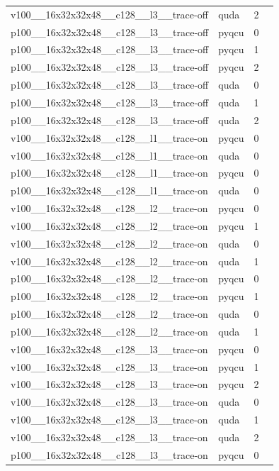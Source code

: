\begin{table}[htbp]
\begin{tabular}{@{}llrr@{}}
v100\_\_16x32x32x48\_\_c128\_\_l3\_\_trace-off & quda & 2 &  \\
p100\_\_16x32x32x48\_\_c128\_\_l3\_\_trace-off & pyqcu & 0 &  \\
p100\_\_16x32x32x48\_\_c128\_\_l3\_\_trace-off & pyqcu & 1 &  \\
p100\_\_16x32x32x48\_\_c128\_\_l3\_\_trace-off & pyqcu & 2 &  \\
p100\_\_16x32x32x48\_\_c128\_\_l3\_\_trace-off & quda & 0 &  \\
p100\_\_16x32x32x48\_\_c128\_\_l3\_\_trace-off & quda & 1 &  \\
p100\_\_16x32x32x48\_\_c128\_\_l3\_\_trace-off & quda & 2 &  \\
v100\_\_16x32x32x48\_\_c128\_\_l1\_\_trace-on & pyqcu & 0 &  \\
v100\_\_16x32x32x48\_\_c128\_\_l1\_\_trace-on & quda & 0 &  \\
p100\_\_16x32x32x48\_\_c128\_\_l1\_\_trace-on & pyqcu & 0 &  \\
p100\_\_16x32x32x48\_\_c128\_\_l1\_\_trace-on & quda & 0 &  \\
v100\_\_16x32x32x48\_\_c128\_\_l2\_\_trace-on & pyqcu & 0 &  \\
v100\_\_16x32x32x48\_\_c128\_\_l2\_\_trace-on & pyqcu & 1 &  \\
v100\_\_16x32x32x48\_\_c128\_\_l2\_\_trace-on & quda & 0 &  \\
v100\_\_16x32x32x48\_\_c128\_\_l2\_\_trace-on & quda & 1 &  \\
p100\_\_16x32x32x48\_\_c128\_\_l2\_\_trace-on & pyqcu & 0 &  \\
p100\_\_16x32x32x48\_\_c128\_\_l2\_\_trace-on & pyqcu & 1 &  \\
p100\_\_16x32x32x48\_\_c128\_\_l2\_\_trace-on & quda & 0 &  \\
p100\_\_16x32x32x48\_\_c128\_\_l2\_\_trace-on & quda & 1 &  \\
v100\_\_16x32x32x48\_\_c128\_\_l3\_\_trace-on & pyqcu & 0 &  \\
v100\_\_16x32x32x48\_\_c128\_\_l3\_\_trace-on & pyqcu & 1 &  \\
v100\_\_16x32x32x48\_\_c128\_\_l3\_\_trace-on & pyqcu & 2 &  \\
v100\_\_16x32x32x48\_\_c128\_\_l3\_\_trace-on & quda & 0 &  \\
v100\_\_16x32x32x48\_\_c128\_\_l3\_\_trace-on & quda & 1 &  \\
v100\_\_16x32x32x48\_\_c128\_\_l3\_\_trace-on & quda & 2 &  \\
p100\_\_16x32x32x48\_\_c128\_\_l3\_\_trace-on & pyqcu & 0 &  \\

\end{tabular}
\end{table}
